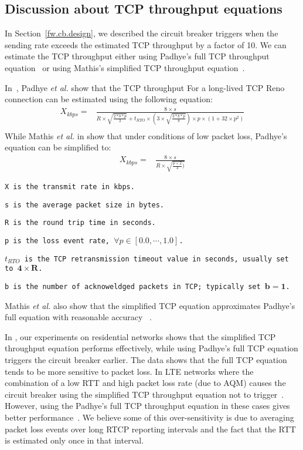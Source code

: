 \subsection{Discussion about TCP throughput equations}

In Section~\ref{fw.cb.design}, we described the circuit breaker triggers when
the sending rate exceeds the estimated TCP throughput by a factor of 10. We
can estimate the TCP throughput either using Padhye's full TCP throughput
equation~\cite{padhye1998modeling} or using Mathis's simplified TCP throughput
equation~\cite{mathis1997macroscopic}.

In~\cite{padhye1998modeling}, Padhye \emph{et al.} show that the TCP
throughput For a long-lived TCP Reno connection can be estimated using the
following equation:
\begin{align*}
X_{kbps} = &\frac{8 \times s}{R \times \sqrt{\frac{2*b*p}{3}}+t_{RTO} \times (3 \times \sqrt{\frac{3*b*p}{8}})\times p \times (1+32 \times p^2)}\\
\end{align*}
While Mathis \emph{et al.} in \cite{mathis1997macroscopic} show that under
conditions of low packet loss, Padhye's equation can be simplified to:
\begin{align*}
    X_{kbps} = & \frac{8 \times s}{R \times \sqrt{\frac{p \times 2}{3})}}
\end{align*}
\begin{itemize}
\setlength{\itemsep}{0pt}
{\footnotesize
\item[] \texttt{X is the transmit rate in kbps.}
\item[] \texttt{s is the average packet size in bytes.} 
\item[] \texttt{R is the round trip time in seconds. }
\item[] \texttt{p is the loss event rate, $\forall p \in [0.0, \cdots ,1.0]$.}
\item[] \texttt{$t_{RTO}$ is the TCP retransmission timeout value in seconds, usually set to $\mathbf{4 \times R}$.}
\item[] \texttt{b is the number of acknoweldged packets in TCP; typically set $\mathbf{b=1}$.}
}
\end{itemize}
Mathis \emph{et al.} also show that the simplified TCP equation approximates
Padhye's full equation with reasonable accuracy~\cite{mathis1997macroscopic} .


In , our experiments on residential networks shows that the
simplified TCP throughput equation performs effectively, while using Padhye's
full TCP equation triggers the circuit breaker earlier. The data shows that
the full TCP equation tends to be more sensitive to packet loss. In LTE
networks where the combination of a low RTT and high packet loss rate (due to
AQM) causes the circuit breaker using the simplified TCP throughput equation
not to trigger~\cite{Sarker:CB.lte}. However, using the Padhye's full TCP
throughput equation in these cases gives better
performance~\cite{Sarker:CB.lte}. We believe some of this over-sensitivity is
due to averaging packet loss events over long RTCP reporting intervals and the
fact that the RTT is estimated only once in that interval.

